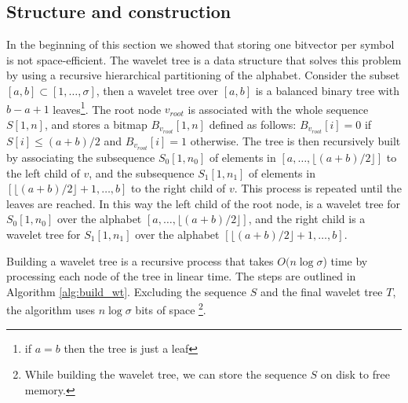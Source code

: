 \subsection{Structure and construction}

In the beginning of this section we showed that storing one bitvector per symbol is not space-efficient. The wavelet tree is a data structure that solves this problem by using a recursive hierarchical partitioning of the alphabet. Consider the subset $[a,b] \subset [1, \dots, \sigma]$, then a wavelet tree over $[a,b]$ is a balanced binary tree with $b-a+1$ leaves\footnote{if $a=b$ then the tree is just a leaf}. The root node $v_{root}$ is associated with the whole sequence $S[1,n]$, and stores a bitmap $B_{v_{root}}[1,n]$ defined as follows: $B_{v_{root}}[i] = 0$ if $S[i] \leq (a+b)/2$ and $B_{v_{root}}[i] = 1$ otherwise. The tree is then recursively built by associating the subsequence $S_0[1,n_0]$ of elements in $[a, \dots,\lfloor (a+b)/2 \rfloor ]$ to the left child of $v$, and the subsequence $S_1[1,n_1]$ of elements in $[\lfloor (a+b)/2 \rfloor +1,\dots, b]$ to the right child of $v$. This process is repeated until the leaves are reached. In this way the left child of the root node, is a wavelet tree for $S_0[1,n_0]$ over the alphabet $[a,\dots, \lfloor (a+b)/2 \rfloor ]$, and the right child is a wavelet tree for $S_1[1,n_1]$ over the alphabet $[\lfloor (a+b)/2 \rfloor +1,\dots, b]$. \cite{WTForALL} \vspace{0.4cm}

\noindent Building a wavelet tree is a recursive process that takes $O(n\log \sigma$) time by processing each node of the tree in linear time. The steps are outlined in Algorithm \ref{alg:build_wt}. Excluding the sequence $S$ and the final wavelet tree $T$, the algorithm uses $n \log \sigma$ bits of space \footnote{While building the wavelet tree, we can store the sequence $S$ on disk to free memory.}.

